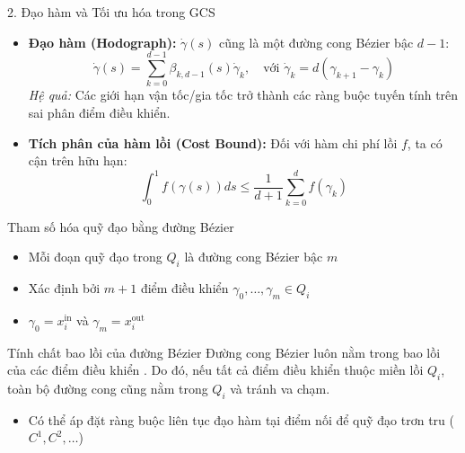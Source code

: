 \documentclass[aspectratio=169]{beamer}
\begin{document}
\begin{frame}{2. Đạo hàm và Tối ưu hóa trong GCS}
    \begin{itemize}
        \item \textbf{Đạo hàm (Hodograph):}
              $\dot{\gamma}(s)$ cũng là một đường cong Bézier bậc $d-1$:
              \begin{equation*}
                  \dot{\gamma}(s) = \sum_{k=0}^{d-1} \beta_{k,d-1}(s) \dot{\gamma}_k, \quad \text{với } \dot{\gamma}_k = d(\gamma_{k+1} - \gamma_k)
              \end{equation*}
              \textit{Hệ quả:} Các giới hạn vận tốc/gia tốc trở thành các ràng buộc tuyến tính trên sai phân điểm điều khiển.

              \vspace{0.3cm}
        \item \textbf{Tích phân của hàm lồi (Cost Bound):}
              Đối với hàm chi phí lồi $f$, ta có cận trên hữu hạn:
              \begin{equation*}
                  \int_0^1 f(\gamma(s))ds \le \frac{1}{d+1} \sum_{k=0}^d f(\gamma_k)
              \end{equation*}
    \end{itemize}

\end{frame}

\begin{frame}{Tham số hóa quỹ đạo bằng đường Bézier}
    \begin{itemize}
        \item Mỗi đoạn quỹ đạo trong $Q_i$ là đường cong Bézier bậc $m$
        \item Xác định bởi $m+1$ điểm điều khiển $\gamma_0, \ldots, \gamma_m \in Q_i$
        \item $\gamma_0 = x_i^{\text{in}}$ và $\gamma_m = x_i^{\text{out}}$
    \end{itemize}

    \begin{block}{Tính chất bao lồi của đường Bézier}
        Đường cong Bézier luôn nằm trong bao lồi của các điểm điều khiển \cite{farin2002}. Do đó, nếu tất cả điểm điều khiển thuộc miền lồi $Q_i$, toàn bộ đường cong cũng nằm trong $Q_i$ và tránh va chạm.
    \end{block}

    \begin{itemize}
        \item Có thể áp đặt ràng buộc liên tục đạo hàm tại điểm nối để quỹ đạo trơn tru
              ($C^1, C^2, \ldots$) \cite{marcucci2023motion}
    \end{itemize}
\end{frame}
\end{document}
